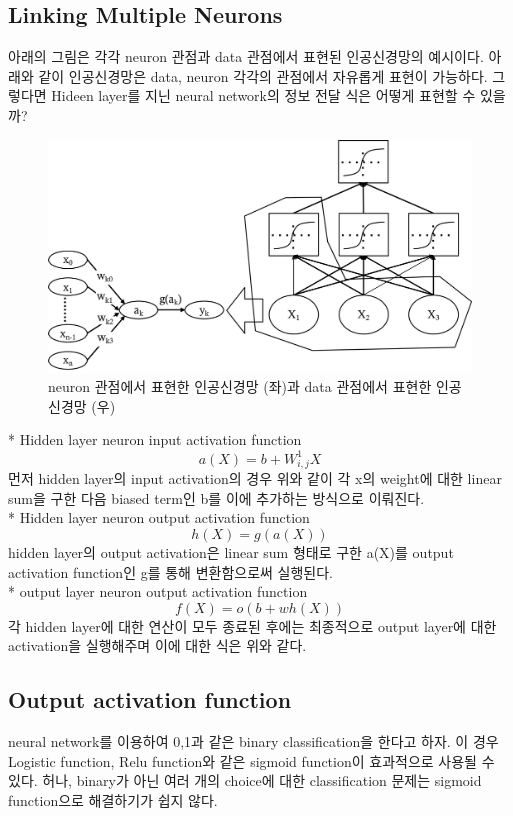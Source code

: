 \documentclass[draft=false]{oblivoir}
\begin{document}
\subsection{Linking Multiple Neurons}
아래의 그림은 각각 neuron 관점과 data 관점에서 표현된 인공신경망의 예시이다. 아래와 같이 인공신경망은 data, neuron 각각의 관점에서 자유롭게 표현이 가능하다. 그렇다면 Hideen layer를 지닌 neural network의 정보 전달 식은 어떻게 표현할 수 있을까?\\
\begin{figure}[ht] \centering 
\includegraphics[scale=0.5]{fig14_17.png} 
\caption{neuron 관점에서 표현한 인공신경망 (좌)과 data 관점에서 표현한 인공신경망 (우)}
\label{fig:14-17}
\end{figure}
* Hidden layer neuron input activation function
\begin{equation}
a(X) = b + W^{1}_{i,j}X
\label{eq:14-2-9}
\end{equation}
먼저 hidden layer의 input activation의 경우 위와 같이 각 x의 weight에 대한 linear sum을 구한 다음 biased term인 b를 이에 추가하는 방식으로 이뤄진다.\\
* Hidden layer neuron output activation function
\begin{equation}
h(X) = g(a(X))
\label{eq:14-2-10}
\end{equation}
hidden layer의 output activation은 linear sum 형태로 구한 a(X)를 output activation function인 g를 통해 변환함으로써 실행된다. \\
* output layer neuron output activation function
\begin{equation}
f(X) =o(b + wh(X))
\label{eq:14-2-11}
\end{equation}
각 hidden layer에 대한 연산이 모두 종료된 후에는 최종적으로 output layer에 대한 activation을 실행해주며 이에 대한 식은 위와 같다. 
\subsection{Output activation function}
neural network를 이용하여 0,1과 같은 binary classification을 한다고 하자. 이 경우 Logistic function, Relu function와 같은 sigmoid function이 효과적으로 사용될 수 있다. 허나, binary가 아닌 여러 개의 choice에 대한 classification 문제는 sigmoid function으로 해결하기가 쉽지 않다.
\end{document}
